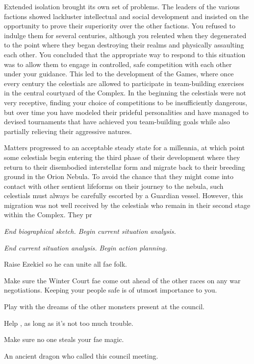 \documentclass[char]{guardians}
\begin{document}
Extended isolation brought its own set of problems. The leaders of the various factions showed lackluster intellectual and social development and insisted on the opportunity to prove their superiority over the other factions. You refused to indulge them for several centuries, although you relented when they degenerated to the point where they began destroying their realms and physically assaulting each other. You concluded that the appropriate way to respond to this situation was to allow them to engage in controlled, safe competition with each other under your guidance. This led to the development of the Games, where once every century the celestials are allowed to participate in team-building exercises in the central courtyard of the Complex. In the beginning the celestials were not very receptive, finding your choice of competitions to be insufficiently dangerous, but over time you have modeled their prideful personalities and have managed to devised tournaments that have achieved you team-building goals while also partially relieving their aggressive natures.

Matters progressed to an acceptable steady state for a millennia, at which point some celestials begin entering the third phase of their development where they return to their disembodied interstellar form and migrate back to their breeding ground in the Orion Nebula. To avoid the chance that they might come into contact with other sentient lifeforms on their journey to the nebula, such celestials must always be carefully escorted by a Guardian vessel. However, this migration was not well received by the celestials who remain in their second stage within the Complex. They pr


\emph{End biographical sketch. Begin current situation analysis.}

\emph{End current situation analysis. Begin action planning.}

\begin{itemz}[Goals]
  \item Raise Ezekiel so he can unite all fae folk.
  \item Make sure the Winter Court fae come out ahead of the other races on any war negotiations. Keeping your people safe is of utmost importance to you.
  \item Play with the dreams of the other monsters present at the council.
  \item Help \cCaretaker{}, as long as it's not too much trouble.
  \item Make sure no one steals your fae magic.
\end{itemz}


\begin{contacts}
  \contact{\cCaretaker{}} An ancient dragon who called this council meeting.
\end{contacts}
\end{document}
